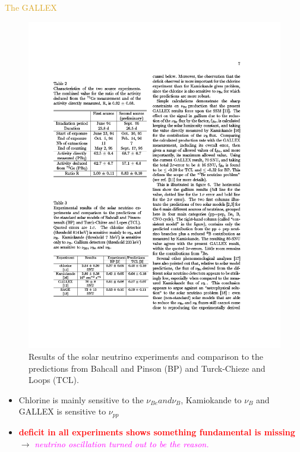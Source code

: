 \documentclass[11pt]{beamer} %
\renewcommand{\(}{\begin{columns}}
\renewcommand{\)}{\end{columns}}
\newcommand{\<}[1]{\begin{column}{#1}}
\renewcommand{\>}{\end{column}}
\newcommand{\itt}{\begin{itemize}}
\newcommand{\tti}{\end{itemize}}
\newcommand{\hlt}[2]{\textcolor{#1}{\textbf{#2}}}
\begin{document}
\begin{frame}{\textcolor{Goldenrod}{The GALLEX}}
  \begin{figure}[h]
    \centering
    \includegraphics[width=0.6\linewidth, height=0.3\textheight]{./Images/GALLEX03}
    \caption*{Results of the solar neutrino experiments and comparison
      to the predictions from Bahcall and Pinson (BP) and Turck-Chieze
      and Loops (TCL).
    }
  \end{figure}
  \itt
\item<2-> Chlorine is mainly sensitive to the $\nu_{Be} and \nu_B$,
  Kamiokande to $\nu_B$ and GALLEX is sensitive to $\nu_{pp}$
\item<3-> \hlt{Red}{deficit in all experiments shows something
    fundamental is missing} $\to$
  {\it \textcolor{Magenta}{neutrino oscillation turned out to be the reason.}}
  \tti
\end{frame}
\end{document}

